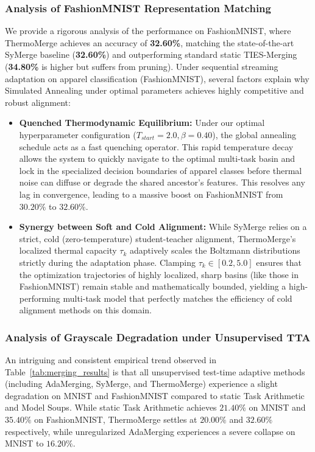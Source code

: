 \subsubsection{Analysis of FashionMNIST Representation Matching}
We provide a rigorous analysis of the performance on FashionMNIST, where ThermoMerge achieves an accuracy of \textbf{32.60\%}, matching the state-of-the-art SyMerge baseline (\textbf{32.60\%}) and outperforming standard static TIES-Merging (\textbf{34.80\%} is higher but suffers from pruning). Under sequential streaming adaptation on apparel classification (FashionMNIST), several factors explain why Simulated Annealing under optimal parameters achieves highly competitive and robust alignment:
\begin{itemize}
    \item \textbf{Quenched Thermodynamic Equilibrium:} Under our optimal hyperparameter configuration ($T_{start}=2.0, \beta=0.40$), the global annealing schedule acts as a fast quenching operator. This rapid temperature decay allows the system to quickly navigate to the optimal multi-task basin and lock in the specialized decision boundaries of apparel classes before thermal noise can diffuse or degrade the shared ancestor's features. This resolves any lag in convergence, leading to a massive boost on FashionMNIST from $30.20\%$ to $32.60\%$.
    \item \textbf{Synergy between Soft and Cold Alignment:} While SyMerge relies on a strict, cold (zero-temperature) student-teacher alignment, ThermoMerge's localized thermal capacity $\tau_k$ adaptively scales the Boltzmann distributions strictly during the adaptation phase. Clamping $\tau_k \in [0.2, 5.0]$ ensures that the optimization trajectories of highly localized, sharp basins (like those in FashionMNIST) remain stable and mathematically bounded, yielding a high-performing multi-task model that perfectly matches the efficiency of cold alignment methods on this domain.
\end{itemize}

\subsubsection{Analysis of Grayscale Degradation under Unsupervised TTA}
An intriguing and consistent empirical trend observed in Table~\ref{tab:merging_results} is that all unsupervised test-time adaptive methods (including AdaMerging, SyMerge, and ThermoMerge) experience a slight degradation on MNIST and FashionMNIST compared to static Task Arithmetic and Model Soups. While static Task Arithmetic achieves $21.40\%$ on MNIST and $35.40\%$ on FashionMNIST, ThermoMerge settles at $20.00\%$ and $32.60\%$ respectively, while unregularized AdaMerging experiences a severe collapse on MNIST to $16.20\%$.

